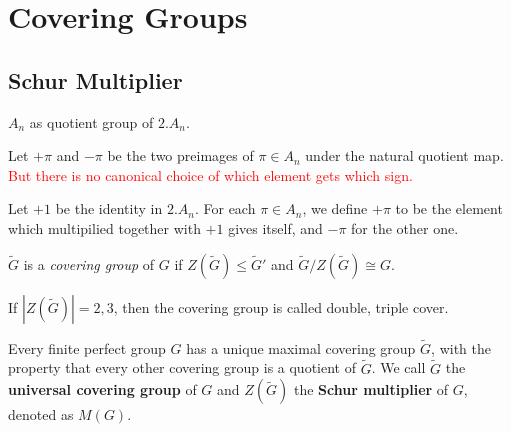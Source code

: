 \documentclass[a4paper,11pt]{article}
\def\maintitle#1{\section*{#1}}
\def\subtitle#1{\section{#1}}
\begin{document}
\else %
    \ifx\chaptitle\undefined %
        \def\maintitle#1{\subsection{#1}}
        \def\subtitle#1{\subsubsection{#1}}
    \else %
        \def\maintitle#1{\section{#1}}
        \def\subtitle#1{\subsection{#1}}
    \fi
\fi

\maintitle{Covering Groups}
\subtitle{Schur Multiplier}

$A_n$ as quotient group of $2.A_n$.

Let $+\pi$ and $-\pi$ be the two preimages of $\pi\in A_n$ under the natural quotient map. \textcolor{red}{But there is no canonical choice of which element gets which sign.}

{\color{gray}
Let $+1$ be the identity in $2.A_n$. For each $\pi\in A_n$, we define $+\pi$ to be the element which multipilied together with $+1$ gives itself, and $-\pi$ for the other one.
}

\begin{definition}
	$\tilde{G}$ is a \textit{covering group} of $G$ if $Z(\tilde{G})\leq \tilde{G}'$ and $\tilde{G}/Z(\tilde{G})\cong G$. 

    If $|Z(\tilde{G})|=2,3$, then the covering group is called double, triple cover.
\end{definition}

\begin{theorem}[Schur]
	Every finite perfect group $G$ has a unique maximal covering group $\tilde{G}$, with the property that every other covering group is a quotient of $\tilde{G}$. 
    We call $\tilde{G}$ the \textbf{universal covering group} of $G$ and $Z(\tilde{G})$ the \textbf{Schur multiplier} of $G$, denoted as $M(G)$.
\end{theorem}
\end{document}
